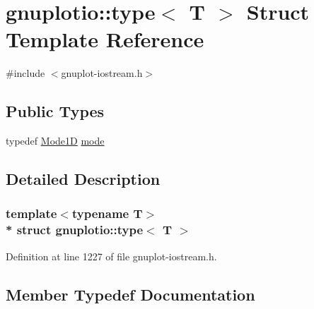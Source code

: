 \hypertarget{structgnuplotio_1_1_mode_auto_decoder_3_01_t_00_01typename_01boost_1_1enable__if__c_3_01_07_arraea646779afc1e35efaeffcebe81e18a0}{}\section{gnuplotio\+:\+:type$<$ T $>$ Struct Template Reference}
\label{structgnuplotio_1_1_mode_auto_decoder_3_01_t_00_01typename_01boost_1_1enable__if__c_3_01_07_arraea646779afc1e35efaeffcebe81e18a0}


{\ttfamily \#include $<$gnuplot-\/iostream.\+h$>$}

\subsection*{Public Types}
\begin{DoxyCompactItemize}
\item 
typedef \hyperlink{structgnuplotio_1_1_mode1_d}{Mode1D} \hyperlink{structgnuplotio_1_1_mode_auto_decoder_3_01_t_00_01typename_01boost_1_1enable__if__c_3_01_07_arraea646779afc1e35efaeffcebe81e18a0_a17dc2e2ec9d21833a8bd6f1a67e32e48}{mode}
\end{DoxyCompactItemize}


\subsection{Detailed Description}
\subsubsection*{template$<$typename T$>$\\*
struct gnuplotio\+::type$<$ T $>$}



Definition at line 1227 of file gnuplot-\/iostream.\+h.



\subsection{Member Typedef Documentation}
